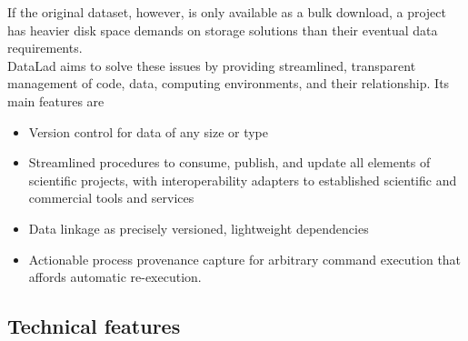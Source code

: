 {If the original dataset, however, is only available as a bulk download, a project has heavier disk space demands on storage solutions than their eventual data requirements.\\
DataLad aims to solve these issues by providing streamlined, transparent management of code, data, computing environments, and their relationship.
Its main features are
\begin{itemize}
	\item Version control for data of any size or type
	\item Streamlined procedures to consume, publish, and update  all elements of scientific projects, with interoperability adapters to established scientific and commercial tools and services
	\item Data linkage as precisely versioned, lightweight dependencies
	\item Actionable process provenance capture for arbitrary command execution that affords automatic re-execution.
\end{itemize}

\subsection{Technical features}

}
